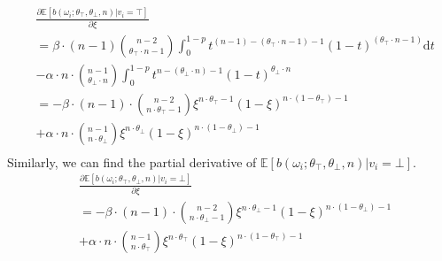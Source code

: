 \documentclass[11pt]{article}
\begin{document}
\begin{equation}
  \label{eq:expectation_top_partial}
  \begin{aligned}
    &\frac{\partial\mathbb{E}[b(\omega_i;\theta_\top,\theta_\bot,n )| v_i=\top]}{\partial\xi} \\
    &= \beta\cdot (n-1)\binom{n-2}{\theta_\top\cdot n-1}\int^{1-p}_0t^{(n - 1) - (\theta_\top\cdot n - 1) - 1} (1 - t)^{(\theta_\top\cdot n - 1)}\text{d} t\\
    &-\alpha\cdot n \cdot \binom{n-1}{\theta_\bot\cdot n}\int^{1-p}_0t^{n - (\theta_\bot\cdot n) - 1} (1 - t)^{\theta_\bot\cdot n}\\
    &= -\beta\cdot (n-1)\cdot \binom{n-2}{n\cdot\theta_\top-1}\xi^{n\cdot\theta_\top-1}(1-\xi)^{n\cdot(1-\theta_\top)-1} \\
    &+\alpha\cdot n \cdot \binom{n-1}{n\cdot\theta_\bot}\xi^{n\cdot\theta_\bot}(1-\xi)^{n\cdot(1-\theta_\bot)-1}\\
  \end{aligned}
\end{equation}
Similarly, we can find the partial derivative of $\mathbb{E}[b(\omega_i;\theta_\top,\theta_\bot,n )| v_i=\bot]$.
\begin{equation}
  \label{eq:expectation_bot_partial}
  \begin{aligned}
    &\frac{\partial\mathbb{E}[b(\omega_i;\theta_\top,\theta_\bot,n )| v_i=\bot]}{\partial\xi} \\
    &= -\beta\cdot (n-1)\cdot \binom{n-2}{n\cdot\theta_\bot-1}\xi^{n\cdot\theta_\bot-1}(1-\xi)^{n\cdot(1-\theta_\bot)-1} \\
    &+\alpha\cdot n \cdot \binom{n-1}{n\cdot\theta_\top}\xi^{n\cdot\theta_\top}(1-\xi)^{n\cdot(1-\theta_\top)-1}\\
  \end{aligned}
\end{equation}
\end{document}
